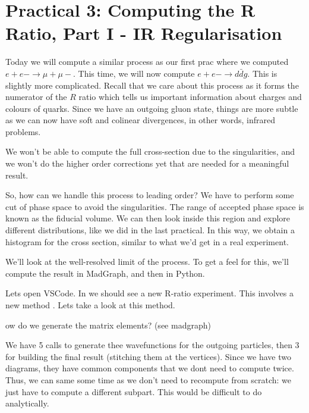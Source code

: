 \section*{Practical 3: Computing the R Ratio, Part I - IR Regularisation }

Today we will compute a similar process as our first prac where we computed $e+ e-\to \mu+\mu-$. This time, we will now compute $e+e-\to d\bar{d}g$. This is slightly more complicated. Recall that we care about this process as it forms the numerator of the $R$ ratio which tells us important information about charges and colours of quarks. Since we have an outgoing gluon state, things are more subtle as we can now have soft and colinear divergences, in other words, infrared problems. 

We won't be able to compute the full cross-section due to the singularities, and we won't do the higher order corrections yet that are needed for a meaningful result.

So, how can we handle this process to leading order? We have to perform some cut of phase space to avoid the singularities. The range of accepted phase space is known as the fiducial volume. We can then look inside this region and explore different distributions, like we did in the last practical. In this way, we obtain a histogram for the cross section, similar to what we'd get in a real experiment.


We'll look at the well-resolved limit of the process. To get a feel for this, we'll compute the result in MadGraph, and then in Python.

Lets open VSCode. In  we should see a new R-ratio experiment. This involves a new method . Lets take a look at this method.

ow do we generate the matrix elements? (see madgraph)

We have 5 calls to generate thee wavefunctions for the outgoing particles, then 3 for building the final result (stitching them at the vertices). Since we have two diagrams, they have common components that we dont need to compute twice. Thus, we can same some time as we don't need to recompute from scratch: we just have to compute a different subpart. This would be difficult to do analytically.

